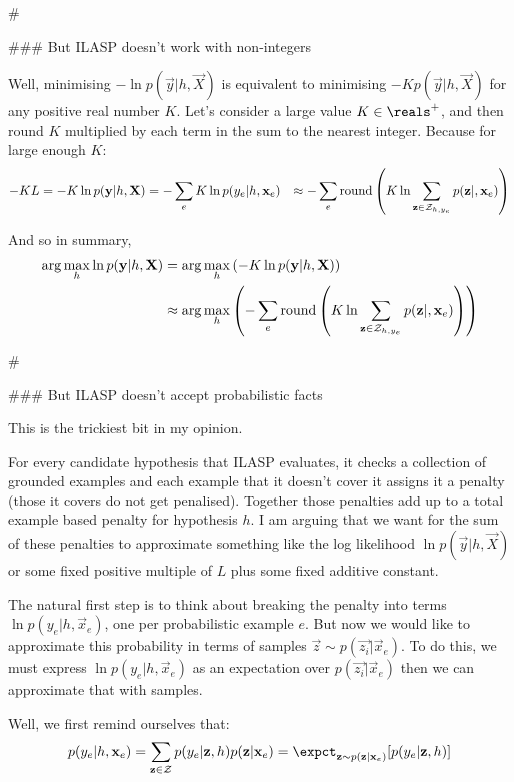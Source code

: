 #%

### But ILASP doesn't work with non-integers

Well, minimising $-\ln p(\vec{y}|h, \vec{X})$ is equivalent to minimising $-Kp(\vec{y}|h, \vec{X})$ for any positive real number $K$. Let's consider a large value $K \in \reals^+$, and then round $K$ multiplied by each term in the sum to the nearest integer. Because for large enough $K$:
\begin{align}
-K L = -K \ln p(\textbf{y}|h, \textbf{X})
& = -\sum_{e} K\ln p(y_e|h, \textbf{x}_e)
& \approx -\sum_{e} \text{round}\left(K\ln \sum_{\textbf{z} \in \mathcal{Z}_{h, y_e}} p(\textbf{z}|,\textbf{x}_e) \right)
\end{align}

And so in summary,
\begin{align}
\arg\max_{h}\ln p(\textbf{y}|h, \textbf{X}) 
& = \arg\max_{h} \left( -K \ln p(\textbf{y}|h, \textbf{X}) \right) \\
& \approx \arg\max_h \left( -\sum_{e} \text{round}\left(K\ln \sum_{\textbf{z} \in \mathcal{Z}_{h, y_e}} p(\textbf{z}|,\textbf{x}_e) \right)\right)
\end{align}

#%

### But ILASP doesn't accept probabilistic facts

This is the trickiest bit in my opinion.

For every candidate hypothesis that ILASP evaluates, it checks a collection of grounded examples and each example that it doesn't cover it assigns it a penalty (those it covers do not get penalised). Together those penalties add up to a total example based penalty for hypothesis $h$. I am arguing that we want for the sum of these penalties to approximate something like the log likelihood $\ln p(\vec{y}|h, \vec{X})$ or some fixed positive multiple of $L$ plus some fixed additive constant.

The natural first step is to think about breaking the penalty into terms $\ln p(y_e|h, \vec{x}_e)$, one per probabilistic example $e$. But now we would like to approximate this probability in terms of samples $\vec{z} \sim p(\vec{z_i}|\vec{x}_e)$. To do this, we must express $\ln p(y_e|h, \vec{x}_e)$ as an expectation over $p(\vec{z_i}|\vec{x}_e)$ then we can approximate that with samples.

Well, we first remind ourselves that:
\begin{align}
p(y_e|h, \vec{x}_e)
= \sum_{\vec{z} \in \curly{Z}} p(y_e|\vec{z},h)
p(\vec{z}| \vec{x}_e)
= \expct_{\vec{z} \sim p(\vec{z}| \vec{x}_e)}[p(y_e|\vec{z},h)]
\end{align}

